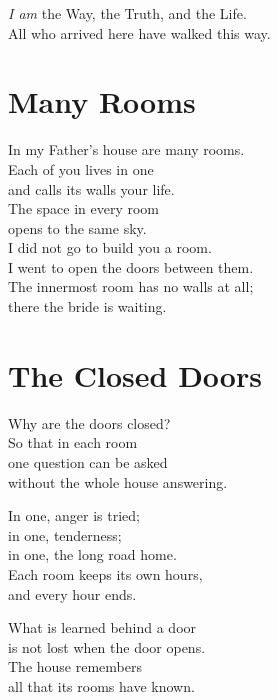 \documentclass[10pt, openright]{book}
\newcommand{\sectionbreak}{\filbreak}
\newcommand{\sayingsource}[1]{\par\nopagebreak\vspace{0.3\baselineskip}{\raggedleft\footnotesize\itshape #1\par}}
\begin{document}
\emph{I am} the Way, the Truth, and the Life.\\
All who arrived here have walked this way.

\sayingsource{John 14:6 · Ashtavakra Gita 1.3, 1.7 · Tathāgata}

\sectionbreak

\section{Many Rooms}\label{many-rooms}

In my Father's house are many rooms.\\
Each of you lives in one\\
and calls its walls your life.\\
The space in every room\\
opens to the same sky.\\
I did not go to build you a room.\\
I went to open the doors between them.\\
The innermost room has no walls at all;\\
there the bride is waiting.

\sayingsource{John 14:2 · Ashtavakra Gita 1.20 · Chandogya Upanishad 8.1
· Teresa of Ávila, Interior Castle}

\sectionbreak

\section{The Closed Doors}\label{the-closed-doors}

Why are the doors closed?\\
So that in each room\\
one question can be asked\\
without the whole house answering.

In one, anger is tried;\\
in one, tenderness;\\
in one, the long road home.\\
Each room keeps its own hours,\\
and every hour ends.

What is learned behind a door\\
is not lost when the door opens.\\
The house remembers\\
all that its rooms have known.

\sayingsource{John 14:2 · Pratyabhijñā-hṛdayam 4 · Plotinus, Enneads
4.8.5--7}
\end{document}
